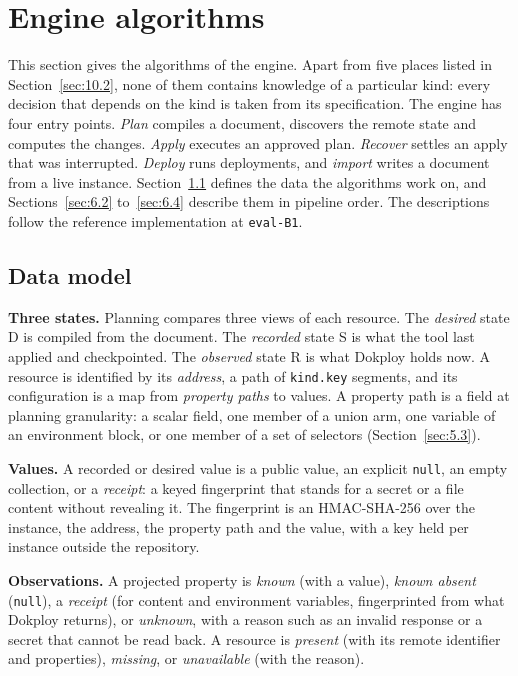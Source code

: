 \section{Engine algorithms}\label{sec:6}

This section gives the algorithms of the engine. Apart from five places listed in Section~\ref{sec:10.2},
none of them contains knowledge of a particular kind: every decision that depends on the kind is
taken from its specification. The engine has four
entry points. \emph{Plan} compiles a document, discovers the remote state and computes the changes.
\emph{Apply} executes an approved plan. \emph{Recover} settles an apply that was interrupted. \emph{Deploy} runs
deployments, and \emph{import} writes a document from a live instance. Section~\ref{sec:6.1} defines the data the
algorithms work on, and Sections~\ref{sec:6.2} to~\ref{sec:6.4} describe them in pipeline order. The descriptions follow
the reference implementation at \texttt{eval-B1}.

\subsection{Data model}\label{sec:6.1}

\textbf{Three states.} Planning compares three views of each resource. The \emph{desired} state D is compiled
from the document. The \emph{recorded} state S is what the tool last applied and checkpointed. The
\emph{observed} state R is what Dokploy holds now. A resource is identified by its \emph{address}, a path of
\texttt{kind.key} segments, and its configuration is a map from \emph{property paths} to values. A property path
is a field at planning granularity: a scalar field, one member of a union arm, one variable of an
environment block, or one member of a set of selectors (Section~\ref{sec:5.3}).

\textbf{Values.} A recorded or desired value is a public value, an explicit \texttt{null}, an empty collection, or
a \emph{receipt}: a keyed fingerprint that stands for a secret or a file content without revealing it. The
fingerprint is an HMAC-SHA-256 over the instance, the address, the property path and the value, with
a key held per instance outside the repository.

\textbf{Observations.} A projected property is \emph{known} (with a value), \emph{known absent} (\texttt{null}), a \emph{receipt}
(for content and environment variables, fingerprinted from what Dokploy returns), or \emph{unknown}, with a
reason such as an invalid response or a secret that cannot be read back. A resource is \emph{present} (with
its remote identifier and properties), \emph{missing}, or \emph{unavailable} (with the reason).

